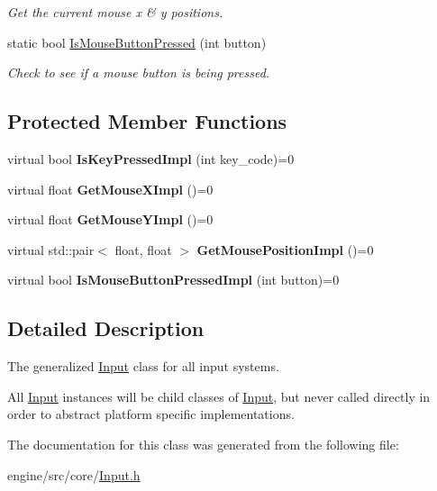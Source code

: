 \begin{DoxyCompactItemize}
\begin{DoxyCompactList}\small\item\em Get the current mouse x \& y positions. \end{DoxyCompactList}\item 
\mbox{\label{classengine_1_1Input_acaa32590a2b39e0eb822c01d5b7815dc}} 
static bool \hyperlink{classengine_1_1Input_acaa32590a2b39e0eb822c01d5b7815dc}{Is\+Mouse\+Button\+Pressed} (int button)
\begin{DoxyCompactList}\small\item\em Check to see if a mouse button is being pressed. \end{DoxyCompactList}\end{DoxyCompactItemize}
\subsection*{Protected Member Functions}
\begin{DoxyCompactItemize}
\item 
\mbox{\label{classengine_1_1Input_a296cc17bac6e2ebc45d178c3c06c0d63}} 
virtual bool {\bfseries Is\+Key\+Pressed\+Impl} (int key\+\_\+code)=0
\item 
\mbox{\label{classengine_1_1Input_ad9b92c2cccac4db3431bed2143326329}} 
virtual float {\bfseries Get\+Mouse\+X\+Impl} ()=0
\item 
\mbox{\label{classengine_1_1Input_a490d05f204808bdae219da6d1b03eb12}} 
virtual float {\bfseries Get\+Mouse\+Y\+Impl} ()=0
\item 
\mbox{\label{classengine_1_1Input_a0d98b07560fa833c7a482341e6c76dbc}} 
virtual std\+::pair$<$ float, float $>$ {\bfseries Get\+Mouse\+Position\+Impl} ()=0
\item 
\mbox{\label{classengine_1_1Input_a9fb17f21b15540890cb69d87d3749cdd}} 
virtual bool {\bfseries Is\+Mouse\+Button\+Pressed\+Impl} (int button)=0
\end{DoxyCompactItemize}


\subsection{Detailed Description}
The generalized \hyperlink{classengine_1_1Input}{Input} class for all input systems. 

All \hyperlink{classengine_1_1Input}{Input} instances will be child classes of \hyperlink{classengine_1_1Input}{Input}, but never called directly in order to abstract platform specific implementations. 

The documentation for this class was generated from the following file\+:\begin{DoxyCompactItemize}
\item 
engine/src/core/\hyperlink{core_2Input_8h}{Input.\+h}\end{DoxyCompactItemize}
